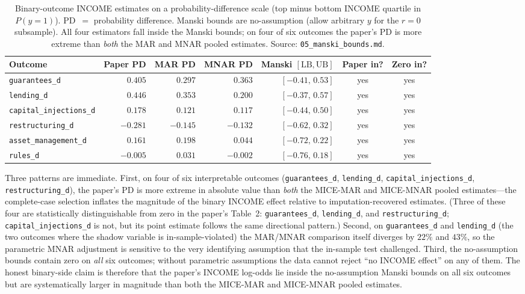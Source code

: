 \documentclass[11pt]{article}
\begin{document}
\begin{table}[h]
\centering
\small
\caption{Binary-outcome INCOME estimates on a probability-difference
scale (top minus bottom INCOME quartile in $P(y = 1)$). PD~$=$
probability difference. Manski bounds are no-assumption (allow
arbitrary $y$ for the $r = 0$ subsample). All four estimators
fall inside the Manski bounds; on four of six outcomes the paper's
PD is more extreme than \emph{both} the MAR and MNAR pooled estimates.
Source: \texttt{05\_manski\_bounds.md}.}
\label{tab:binary}
\begin{tabular}{lrrrrcc}
\toprule
Outcome & Paper PD & MAR PD & MNAR PD &
  Manski $[\text{LB},\text{UB}]$ & Paper in? & Zero in? \\
\midrule
\texttt{guarantees\_d}        & $\;\;\;0.405$ & $\;\;\;0.297$ & $\;\;\;0.363$ & $[-0.41,\,0.53]$ & yes & yes \\
\texttt{lending\_d}           & $\;\;\;0.446$ & $\;\;\;0.353$ & $\;\;\;0.200$ & $[-0.37,\,0.57]$ & yes & yes \\
\texttt{capital\_injections\_d} & $\;\;\;0.178$ & $\;\;\;0.121$ & $\;\;\;0.117$ & $[-0.44,\,0.50]$ & yes & yes \\
\texttt{restructuring\_d}     & $-0.281$ & $-0.145$ & $-0.132$ & $[-0.62,\,0.32]$ & yes & yes \\
\texttt{asset\_management\_d} & $\;\;\;0.161$ & $\;\;\;0.198$ & $\;\;\;0.044$ & $[-0.72,\,0.22]$ & yes & yes \\
\texttt{rules\_d}             & $-0.005$ & $\;\;\;0.031$ & $-0.002$ & $[-0.76,\,0.18]$ & yes & yes \\
\bottomrule
\end{tabular}
\end{table}

Three patterns are immediate. First, on four of six interpretable
outcomes (\texttt{guarantees\_d}, \texttt{lending\_d},
\texttt{capital\_injections\_d}, \texttt{restructuring\_d}), the
paper's PD is more extreme in absolute value than \emph{both} the
MICE-MAR and MICE-MNAR pooled estimates---the complete-case selection
inflates the magnitude of the binary INCOME effect relative to
imputation-recovered estimates. (Three of these four are statistically
distinguishable from zero in the paper's Table~2:
\texttt{guarantees\_d}, \texttt{lending\_d}, and
\texttt{restructuring\_d}; \texttt{capital\_injections\_d} is not, but
its point estimate follows the same directional pattern.) Second, on \texttt{guarantees\_d} and
\texttt{lending\_d} (the two outcomes where the shadow variable is
in-sample-violated) the MAR/MNAR comparison itself diverges by $22\%$
and $43\%$, so the parametric MNAR adjustment is sensitive to the
very identifying assumption that the in-sample test challenged.
Third, the no-assumption bounds contain zero on \emph{all} six
outcomes; without parametric assumptions the data cannot reject ``no
INCOME effect'' on any of them. The honest binary-side claim is
therefore that the paper's INCOME log-odds lie inside the no-assumption
Manski bounds on all six outcomes but are systematically larger in
magnitude than both the MICE-MAR and MICE-MNAR pooled estimates.
\end{document}
